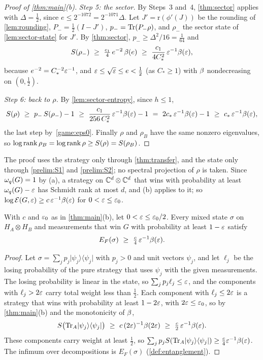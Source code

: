 \begin{proof}[Proof of \cref{thm:main}(b)]
\emph{Step 5: the sector.} By Steps~3 and~4, \cref{thm:sector} applies with $\Delta=\frac12$, since $e\le2^{-1072}=2^{-1071}\Delta$. Let
$J'=\mathrm r(\phi'(J))$ be the rounding of \cref{lem:rounding}, $P_-=\frac12(I-J')$, $p_-=\operatorname{Tr}(P_-\rho)$, and $\rho_-$ the sector state of
\cref{lem:sector-state} for $J'$. By \cref{thm:sector}, $p_-\ge\Delta^2/16=\frac1{64}$ and
\[
S(\rho_-)\ \ge\ \tfrac{c_1}4\,e^{-2}\,\bfun(e)\ \ge\ \frac{c_1}{4C_*^2}\,\eps^{-1}\bfun(\eps),
\]
because $e^{-2}=C_*^{-2}\varepsilon^{-1}$, and $\varepsilon\le\sqrt{\varepsilon}\le e<\frac12$ (as $C_*\ge1$) with $\beta$ nondecreasing on $(0,\frac12)$.

\emph{Step 6: back to $\rho$.} By \cref{lem:sector-entropy}, since $h\le1$,
\[
S(\rho)\ \ge\ p_-\,S(\rho_-)-1\ \ge\ \frac{c_1}{256\,C_*^2}\,\eps^{-1}\bfun(\eps)-1\ =\ 2c_*\,\eps^{-1}\bfun(\eps)-1\ \ge\ c_*\,\eps^{-1}\bfun(\eps),
\]
the last step by~\eqref{game:eps0}. Finally $\rho$ and $\rho_B$ have the same nonzero eigenvalues, so
$\log\operatorname{rank}\rho_B=\log\operatorname{rank}\rho\ge S(\rho)=S(\rho_B)$.
\end{proof}

The proof uses the strategy only through \cref{thm:transfer}, and the state only through \ref{prelim:S1} and \ref{prelim:S2}; no spectral
projection of $\rho$ is taken. Since $\omega_{q}(G)=1$ by (a), a strategy on $\mathbb C^d\otimes\mathbb C^d$ that wins with probability at least
$\omega_{q}(G)-\varepsilon$ has Schmidt rank at most $d$, and (b) applies to it; so $\log\mathcal E(G,\varepsilon)\ge c\,\varepsilon^{-1}\beta(\varepsilon)$ for $0<\varepsilon\le\varepsilon_0$.

\begin{corollary}\label{cor:main-EF}
With $c$ and $\varepsilon_0$ as in \cref{thm:main}(b), let $0<\varepsilon\le\varepsilon_0/2$. Every mixed state $\sigma$ on $H_A\otimes H_B$ and measurements
that win $G$ with probability at least $1-\varepsilon$ satisfy
\[
E_F(\sigma)\ \ge\ \tfrac c4\,\varepsilon^{-1}\beta(\varepsilon).
\]
\end{corollary}

\begin{proof}
Let $\sigma=\sum_jp_j\lvert\psi_j\rangle\langle\psi_j\rvert$ with $p_j>0$ and unit vectors $\psi_j$, and let $\ell_j$ be the losing
probability of the pure strategy that uses $\psi_j$ with the given measurements. The losing probability is linear in the state, so
$\sum_jp_j\ell_j\le\varepsilon$, and the components with $\ell_j>2\varepsilon$ carry total weight less than $\frac12$. Each component with $\ell_j\le2\varepsilon$
is a strategy that wins with probability at least $1-2\varepsilon$, with $2\varepsilon\le\varepsilon_0$, so by \cref{thm:main}(b) and the monotonicity of
$\beta$,
\[
S\bigl(\Tr_A\lvert\psi_j\rangle\langle\psi_j\rvert\bigr)\ \ge\ c\,(2\eps)^{-1}\bfun(2\eps)\ \ge\ \tfrac c2\,\eps^{-1}\bfun(\eps).
\]
These components carry weight at least $\frac12$, so $\sum_jp_jS(\operatorname{Tr}_A\lvert\psi_j\rangle\langle\psi_j\rvert)\ge\frac c4\varepsilon^{-1}\beta(\varepsilon)$.
The infimum over decompositions is $E_F(\sigma)$ (\cref{def:entanglement}).
\end{proof}


